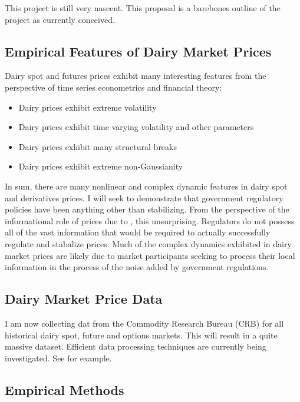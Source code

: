 \documentclass[11pt,]{article}
\def\tightlist{}
\begin{document}
This project is still very nascent. This proposal is a barebones outline
of the project as currently conceived.

\subsection{Empirical Features of Dairy Market
Prices}\label{empirical-features-of-dairy-market-prices}

Dairy spot and futures prices exhibit many interesting features from the
perspective of time series econometrics and financial theory:

\begin{itemize}
\tightlist
\item
  Dairy prices exhibit extreme volatility
\item
  Dairy prices exhibit time varying volatility and other parameters
\item
  Dairy prices exhibit many structural breaks
\item
  Dairy prices exhibit extreme non-Gaussianity
\end{itemize}

In sum, there are many nonlinear and complex dynamic features in dairy
spot and derivatives prices. I will seek to demonstrate that government
regulatory policies have been anything other than stabilizing. From the
perspective of the informational role of prices due to
\citet{Hayek1945}, this unsurprising. Regulators do not possess all of
the vast information that would be required to actually successfully
regulate and stabalize prices. Much of the complex dynamics exhibited in
dairy market prices are likely due to market participants seeking to
process their local information in the process of the noise added by
government regulations.

\subsection{Dairy Market Price Data}\label{dairy-market-price-data}

I am now collecting dat from the Commodity Research Bureau (CRB) for all
historical dairy spot, future and options markets. This will result in a
quite massive dataset. Efficient data processing techniques are
currently being investigated. See \citet{WuBethelGuLeinweberRubel} for
example.

\subsection{Empirical Methods}\label{empirical-methods}
\end{document}
